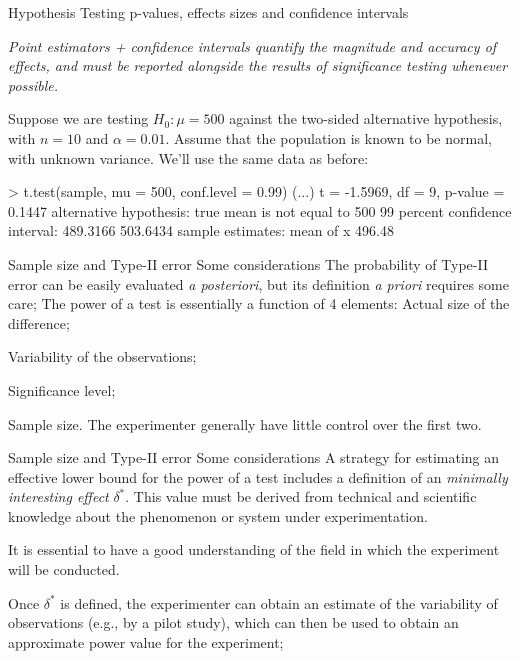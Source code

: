 \documentclass[t]{beamer}
\begin{document}
\begin{ftstf}
{Hypothesis Testing}
{p-values, effects sizes and confidence intervals}
\begin{block}{}
\centering\textit{Point estimators + confidence intervals quantify the magnitude and accuracy of effects, and must be reported alongside the results of significance testing whenever possible.}
\end{block}
\vhalf
Suppose we are testing $H_0: \mu=500$ against the two-sided alternative hypothesis, with $n=10$ and $\alpha=0.01$. Assume that the population is known to be normal, with unknown variance. We'll use the same data as before:
\vhalf
\begin{rcode}
> t.test(sample, mu = 500, conf.level = 0.99)
(...)
t = -1.5969, df = 9, p-value = 0.1447
alternative hypothesis: true mean is not equal to 500
99 percent confidence interval:
 489.3166 503.6434
sample estimates:
mean of x 
   496.48 
\end{rcode}
\end{ftstf}


\begin{ftst}{Sample size and Type-II error}
{Some considerations}
The probability of Type-II error can be easily evaluated \textit{a posteriori}, but its definition \textit{a priori} requires some care;
\vone
The power of a test is essentially a function of 4 elements:
\bitems Actual size of the difference;
	\item Variability of the observations;
	\item Significance level;
	\item Sample size.
\eitem
\vone
The experimenter generally have little control over the first two.
\end{ftst}


\begin{ftst}{Sample size and Type-II error}
{Some considerations}
A strategy for estimating an effective lower bound for the power of a test includes a definition of an \textit{minimally interesting effect} $\delta^*$. 
\vone
This value must be derived from technical and scientific knowledge about the phenomenon or system under experimentation. 
\vhalf
\begin{block}{}
\centering It is essential to have a good understanding of the field in which the experiment will be conducted.
\end{block}
\vhalf
Once $\delta^*$ is defined, the experimenter can obtain an estimate of the variability of observations (e.g., by a pilot study), which can then be used to obtain an approximate power value for the experiment;
\end{ftst}
\end{document}
